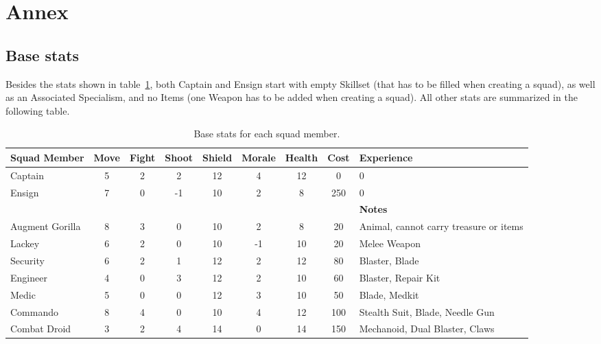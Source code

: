 \documentclass[12pt,a4paper]{article}
\begin{document}
\newpage

\section{Annex}

\subsection{Base stats}

Besides the stats shown in table~\ref{Atable:1}, both Captain and Ensign start with empty Skillset (that has to be filled when creating a squad), as well as an Associated Specialism, and no Items (one Weapon has to be added when creating a squad). All other stats are summarized in the following table.

\begin{table}[h]
\begin{center}
\begin{tabular}{|m{1.8cm}|c|c|c|c|c|c|c| m{2.1cm} |}
\hline
{\bf Squad Member} & {\bf Move} & {\bf Fight} & {\bf Shoot} & {\bf Shield} & {\bf Morale} & {\bf Health} & {\bf Cost} & {\bf Experience}\\
\hline
  Captain & 5 & 2 & 2 & 12 & 4 & 12 & 0 & 0\\
  \hline
  Ensign & 7 & 0 & -1 & 10 & 2 & 8 & 250 & 0\\
  \hline
  & & & & & & & & {\bf Notes} \\
  \hline
  Augment Gorilla & 8 & 3 & 0 & 10 & 2 & 8 & 20 & Animal, cannot carry treasure or items\\
  \hline
  Lackey & 6 & 2 & 0 & 10 & -1 & 10 & 20 & Melee Weapon\\
  \hline
  Security & 6 & 2 & 1 & 12 & 2 & 12 & 80 & Blaster, Blade\\
  \hline
  Engineer & 4 & 0 & 3 & 12 & 2 & 10 & 60 & Blaster, Repair Kit\\
  \hline
  Medic & 5 & 0 & 0 & 12 & 3 & 10 & 50 & Blade, Medkit\\
  \hline
  Commando & 8 & 4 & 0 & 10 & 4 & 12 & 100 & Stealth Suit, Blade, Needle Gun\\
  \hline
  Combat Droid & 3 & 2 & 4 & 14 & 0 & 14 & 150 & Mechanoid, Dual Blaster, Claws\\
\hline
\end{tabular}
\end{center}
\caption{Base stats for each squad member.}
\label{Atable:1}
\end{table}
\end{document}
